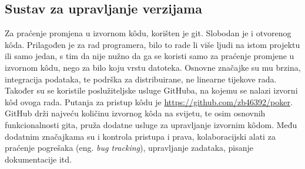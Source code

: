 \subsection{Sustav za upravljanje verzijama}
Za praćenje promjena u izvornom k\^odu, korišten je git. Slobodan je i otvorenog k\^oda. Prilagođen je za rad programera, bilo to rade li više ljudi na istom projektu ili samo jedan, s tim da nije nužno da ga se koristi samo za praćenje promjene u izvornom k\^odu, nego za bilo koju vrstu datoteka. Osnovne značajke su mu brzina, integracija podataka, te podrška za distribuirane, ne linearne tijekove rada. Također su se koristile poslužiteljske usluge GitHuba, na kojemu se nalazi izvorni k\^od ovoga rada. Putanja za pristup k\^odu je \url{https://github.com/zb46392/poker}. GitHub drži najveću količinu izvornog k\^oda na svijetu, te osim osnovnih funkcionalnosti gita, pruža dodatne usluge za upravljanje izvornim k\^odom. Među dodatnim značajkama su i kontrola pristupa i prava, kolaboracijski alati za praćenje pogrešaka (eng. \textit{bug tracking}), upravljanje zadataka, pisanje dokumentacije itd.

